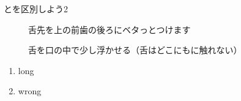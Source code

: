 \documentclass[aspectratio=169,xcolor={dvipsnames,table}]{beamer}
\begin{document}
\begin{frame}[plain]{とを区別しよう2}
\begin{description}
 \item[] 舌先を上の前歯の後ろにベタっとつけます
 \item[] 舌を口の中で少し浮かせる（舌はどこにもに触れない）
\end{description}

\Large 

\vfill

 \begin{enumerate}
  \item long
  \item wrong

 \end{enumerate}

\hfill{}

\end{frame}
\end{document}
